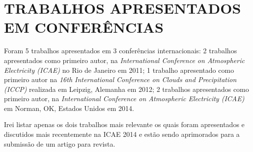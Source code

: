 \chapter{TRABALHOS APRESENTADOS EM CONFERÊNCIAS}

Foram 5 trabalhos apresentados em 3 conferências internacionais: 2 trabalhos apresentados como primeiro autor, na \textit{International Conference on Atmospheric Electricity (ICAE)} no Rio de Janeiro em 2011;  1 trabalho apresentado como primeiro autor na \textit{16th International Conference on Clouds and Precipitation (ICCP)} realizada em Leipzig, Alemanha em 2012; 2 trabalhos apresentados como primeiro autor, na \textit{International Conference on Atmospheric Electricity (ICAE)} em Norman, OK, Estados Unidos em 2014.

Irei listar apenas os dois trabalhos mais relevante os quais foram apresentados e discutidos mais recentemente na ICAE 2014 e estão sendo aprimorados para a submissão de um artigo para revista. 










